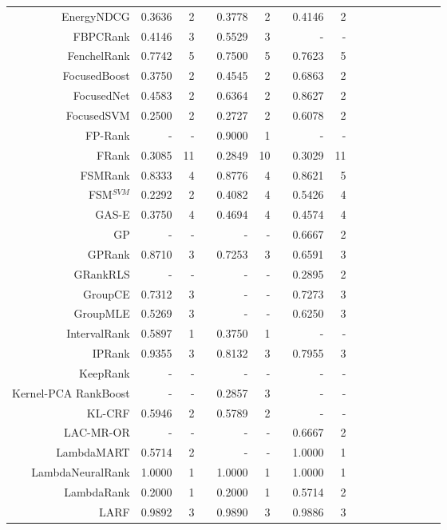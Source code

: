\documentclass{sig-alternate-2013}
\begin{document}
\begin{longtable}{@{}rrrrrrrrrrrrrrrrr@{}}
EnergyNDCG & 0.3636 & 2 && 0.3778 & 2 && 0.4146 & 2 && & && & & \\
FBPCRank & 0.4146 & 3 && 0.5529 & 3 && - & - && & && & & \\
FenchelRank & 0.7742 & 5 && 0.7500 & 5 && 0.7623 & 5 && & && & & \\
FocusedBoost & 0.3750 & 2 && 0.4545 & 2 && 0.6863 & 2 && & && & & \\
FocusedNet & 0.4583 & 2 && 0.6364 & 2 && 0.8627 & 2 && & && & & \\
FocusedSVM & 0.2500 & 2 && 0.2727 & 2 && 0.6078 & 2 && & && & & \\
FP-Rank & - & - && 0.9000 & 1 && - & - && & && & & \\
FRank & 0.3085 & 11 && 0.2849 & 10 && 0.3029 & 11 && & && & & \\
FSMRank & 0.8333 & 4 && 0.8776 & 4 && 0.8621 & 5 && & && & & \\
FSM$^{SVM}$ & 0.2292 & 2 && 0.4082 & 4 && 0.5426 & 4 && & && & & \\
GAS-E & 0.3750 & 4 && 0.4694 & 4 && 0.4574 & 4 && & && & & \\
GP & - & - && - & - && 0.6667 & 2 && & && & & \\
GPRank & 0.8710 & 3 && 0.7253 & 3 && 0.6591 & 3 && & && & & \\
GRankRLS & - & - && - & - && 0.2895 & 2 && & && & & \\
GroupCE & 0.7312 & 3 && - & - && 0.7273 & 3 && & && & & \\
GroupMLE & 0.5269 & 3 && - & - && 0.6250 & 3 && & && & & \\
IntervalRank & 0.5897 & 1 && 0.3750 & 1 && - & - && & && & & \\
IPRank & 0.9355 & 3 && 0.8132 & 3 && 0.7955 & 3 && & && & & \\
KeepRank & - & - && - & - && - & - && & && & & \\
Kernel-PCA RankBoost & - & - && 0.2857 & 3 && - & - && & && & & \\
KL-CRF & 0.5946 & 2 && 0.5789 & 2 && - & - && & && & & \\
LAC-MR-OR & - & - && - & - && 0.6667 & 2 && & && & & \\
LambdaMART & 0.5714 & 2 && - & - && 1.0000 & 1 && & && & & \\
LambdaNeuralRank & 1.0000 & 1 && 1.0000 & 1 && 1.0000 & 1 && & && & & \\
LambdaRank & 0.2000 & 1 && 0.2000 & 1 && 0.5714 & 2 && & && & & \\
LARF & 0.9892 & 3 && 0.9890 & 3 && 0.9886 & 3 && & && & & \\

\end{longtable}
\end{document}
